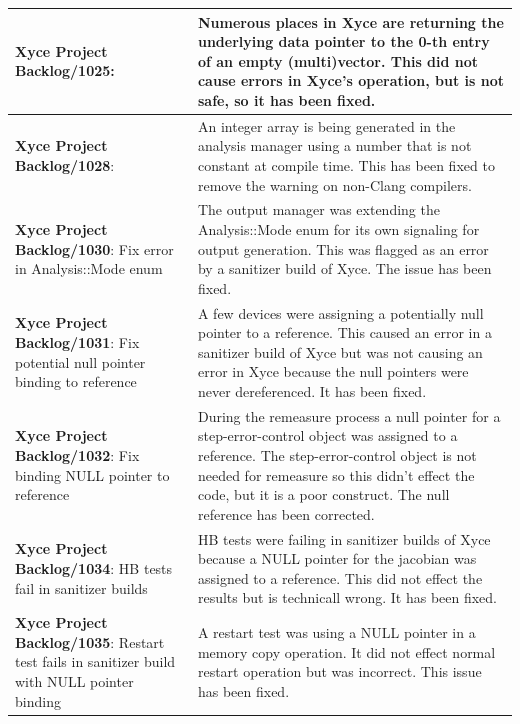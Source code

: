 {\begin{longtable}[h] {>{\raggedright\small}m{2in}|>{\raggedright\let\\\tabularnewline\small}m{3.5in}}
  \textbf{Xyce Project Backlog/1025}:
    &  Numerous places in Xyce are returning the underlying data pointer to the 0-th entry of an empty (multi)vector.
       This did not cause errors in Xyce's operation, but is not safe, so it has been fixed.
  \\\hline

  \textbf{Xyce Project Backlog/1028}:
    &  An integer array is being generated in the analysis manager using a number that is not
       constant at compile time.  This has been fixed to remove the warning on non-Clang compilers.
  \\\hline

\textbf{Xyce Project Backlog/1030}: Fix error in Analysis::Mode enum
  &  The output manager was extending the Analysis::Mode enum for its own signaling for output
     generation.  This was flagged as an error by a sanitizer build of Xyce.  The issue has been fixed.
  \\\hline
  
\textbf{Xyce Project Backlog/1031}: Fix potential null pointer binding to reference
  &  A few devices were assigning a potentially null pointer to a reference.  This caused
  an error in a sanitizer build of Xyce but was not causing an error in Xyce because the 
  null pointers were never dereferenced.  It has been fixed.
  \\\hline

\textbf{Xyce Project Backlog/1032}: Fix binding NULL pointer to reference 
  &  During the remeasure process a null pointer for a step-error-control object was assigned to
  a reference.  The step-error-control object is not needed for remeasure so this didn't effect
  the code, but it is a poor construct.  The null reference has been corrected.
  \\\hline  
  
 \textbf{Xyce Project Backlog/1034}: HB tests fail in sanitizer builds
  &  HB tests were failing in sanitizer builds of Xyce because a NULL pointer for the
  jacobian was assigned to a reference.  This did not effect the results but is technicall
  wrong.  It has been fixed.
  \\\hline  
  
\textbf{Xyce Project Backlog/1035}: Restart test fails in sanitizer build with NULL pointer binding
  &  A restart test was using a NULL pointer in a memory copy operation.  It did not effect
  normal restart operation but was incorrect.  This issue has been fixed.
  \\\hline
  

\end{longtable}}

